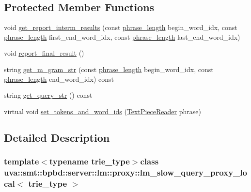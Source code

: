 \subsection*{Protected Member Functions}
\begin{DoxyCompactItemize}
\item 
void \hyperlink{classuva_1_1smt_1_1bpbd_1_1server_1_1lm_1_1proxy_1_1lm__slow__query__proxy__local_ad94e55d741055b8545aa02354718a01e}{get\+\_\+report\+\_\+interm\+\_\+results} (const \hyperlink{namespaceuva_1_1smt_1_1bpbd_1_1server_af068a19c2e03116caf3e3827a3e40e35}{phrase\+\_\+length} begin\+\_\+word\+\_\+idx, const \hyperlink{namespaceuva_1_1smt_1_1bpbd_1_1server_af068a19c2e03116caf3e3827a3e40e35}{phrase\+\_\+length} first\+\_\+end\+\_\+word\+\_\+idx, const \hyperlink{namespaceuva_1_1smt_1_1bpbd_1_1server_af068a19c2e03116caf3e3827a3e40e35}{phrase\+\_\+length} last\+\_\+end\+\_\+word\+\_\+idx)
\item 
void \hyperlink{classuva_1_1smt_1_1bpbd_1_1server_1_1lm_1_1proxy_1_1lm__slow__query__proxy__local_ab320656eb37e9057c42a259b7289f800}{report\+\_\+final\+\_\+result} ()
\item 
string \hyperlink{classuva_1_1smt_1_1bpbd_1_1server_1_1lm_1_1proxy_1_1lm__slow__query__proxy__local_af7e8073bec1f9ab4364cd14b85055d94}{get\+\_\+m\+\_\+gram\+\_\+str} (const \hyperlink{namespaceuva_1_1smt_1_1bpbd_1_1server_af068a19c2e03116caf3e3827a3e40e35}{phrase\+\_\+length} begin\+\_\+word\+\_\+idx, const \hyperlink{namespaceuva_1_1smt_1_1bpbd_1_1server_af068a19c2e03116caf3e3827a3e40e35}{phrase\+\_\+length} end\+\_\+word\+\_\+idx) const 
\item 
string \hyperlink{classuva_1_1smt_1_1bpbd_1_1server_1_1lm_1_1proxy_1_1lm__slow__query__proxy__local_a0b7439f8f17bda502a37a9932918eeee}{get\+\_\+query\+\_\+str} () const 
\item 
virtual void \hyperlink{classuva_1_1smt_1_1bpbd_1_1server_1_1lm_1_1proxy_1_1lm__slow__query__proxy__local_aea40010ea82118a9b86e3c2dea16cead}{set\+\_\+tokens\+\_\+and\+\_\+word\+\_\+ids} (\hyperlink{classuva_1_1utils_1_1file_1_1_text_piece_reader}{Text\+Piece\+Reader} phrase)
\end{DoxyCompactItemize}


\subsection{Detailed Description}
\subsubsection*{template$<$typename trie\+\_\+type$>$class uva\+::smt\+::bpbd\+::server\+::lm\+::proxy\+::lm\+\_\+slow\+\_\+query\+\_\+proxy\+\_\+local$<$ trie\+\_\+type $>$}

